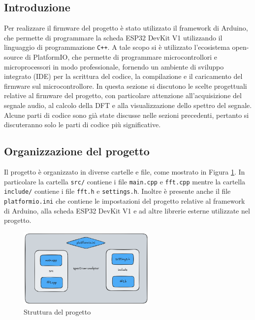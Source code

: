 \documentclass[a4paper,12pt]{report}  %
\newcommand{\lstinlinebg}[1]{\colorbox{backcolour}{\lstinline|#1|}}
\begin{document}
\subsection{Introduzione}
Per realizzare il firmware del progetto è stato utilizzato il framework di Arduino, che permette di programmare la scheda ESP32 DevKit V1 utilizzando il linguaggio di programmazione \lstinlinebg{C++}.
A tale scopo si è utilizzato l'ecosistema open-source di PlatformIO, che permette di programmare microcontrollori e microprocessori in modo professionale, fornendo un ambiente di sviluppo integrato (IDE) per la scrittura del codice, la compilazione e il caricamento del firmware sul microcontrollore.
In questa sezione si discutono le scelte progettuali relative al firmware del progetto, con particolare attenzione all'acquisizione del segnale audio, al calcolo della DFT e alla visualizzazione dello spettro del segnale.
Alcune parti di codice sono già state discusse nelle sezioni precedenti, pertanto si discuteranno solo le parti di codice più significative.

\subsection{Organizzazione del progetto}
Il progetto è organizzato in diverse cartelle e file, come mostrato in Figura \ref{fig:project-structure}.
In particolare la cartella \lstinlinebg{src/} contiene i file \lstinlinebg{main.cpp} e \lstinlinebg{fft.cpp} mentre la cartella \lstinlinebg{include/} contiene i file \lstinlinebg{fft.h} e \lstinlinebg{settings.h}.
Inoltre è presente anche il file \lstinlinebg{platformio.ini} che contiene le impostazioni del progetto relative al framework di Arduino, alla scheda ESP32 DevKit V1 e ad altre librerie esterne utilizzate nel progetto.

\begin{figure}[h]
    \centering
    \includegraphics[width=0.6\textwidth]{imgs/project-structure.png}
    \caption{Struttura del progetto}
    \label{fig:project-structure}
\end{figure}
\end{document}
